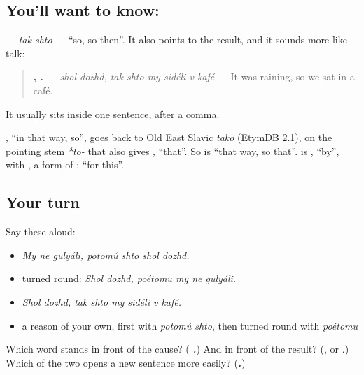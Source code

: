 \subsection*{You'll want to know:  }
\textbf{ } — \emph{tak shto} — \textquotedblleft{}so, so then\textquotedblright{}. It also points to the result, and it sounds more like talk:

\begin{quote}
\textbf{ ,      .} — \emph{shol dozhd, tak shto my sidéli v kafé} — It was raining, so we sat in a café.
\end{quote}

It usually sits inside one sentence, after a comma.

\begin{cousinweb}
\textbf{}, \textquotedblleft{}in that way, so\textquotedblright{}, goes back to Old East Slavic \emph{tako} (EtymDB 2.1), on the pointing stem \emph{*to-} that also gives \emph{}, \textquotedblleft{}that\textquotedblright{}. So \textbf{ } is \textquotedblleft{}that way, so that\textquotedblright{}. \textbf{} is \emph{}, \textquotedblleft{}by\textquotedblright{}, with \emph{}, a form of \emph{}: \textquotedblleft{}for this\textquotedblright{}.
\end{cousinweb}

\subsection*{Your turn}
Say these aloud:

\begin{itemize}
\raggedright
  \item \emph{My ne gulyáli, potomú shto shol dozhd.}
  \item turned round: \emph{Shol dozhd, poétomu my ne gulyáli.}
  \item \emph{Shol dozhd, tak shto my sidéli v kafé.}
  \item a reason of your own, first with \emph{potomú shto}, then turned round with \emph{poétomu}
\end{itemize}

\begin{tcolorbox}[breakable,colback=teal!4,colframe=teal!35!black,title={Before you move on}]
Which word stands in front of the cause? (\emph{\textbf{ .}}) And in front of the result? (\emph{\textbf{}}, or \emph{\textbf{ }}.) Which of the two opens a new sentence more easily? (\emph{\textbf{.}})
\end{tcolorbox}
